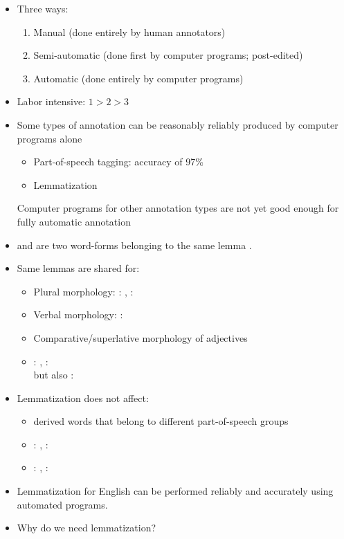 \documentclass[a4paper,landscape,headrule,footrule,dvips]{foils}
\begin{document}
\begin{CJK}{UTF8}{min}
\begin{itemize}
\item  Three ways:
  \begin{enumerate}
  \item Manual (done entirely by human annotators)
  \item Semi-automatic (done first by computer programs; post-edited)
  \item Automatic (done entirely by computer programs)
  \end{enumerate}
\item  Labor intensive: $1 > 2 > 3$
\item  Some types of annotation can be reasonably reliably produced by computer
   programs alone
\begin{itemize}
\item Part-of-speech tagging: accuracy of 97\%
\item Lemmatization
\end{itemize}
Computer programs for other annotation types are not yet good
enough for fully automatic annotation
\end{itemize}





\begin{itemize}
\item  {} and  are two word-forms belonging to the same lemma .
\item  Same lemmas are shared for:
\begin{itemize}
\item  Plural morphology: : , : 
\item  Verbal morphology: : 
\item  Comparative/superlative morphology of adjectives
\item  {}: , :
\\ but also : 
\end{itemize}
\item  Lemmatization does not affect:
  \begin{itemize}
  \item  derived words that belong to different part-of-speech groups
  \item  {}: , : 
  \item  {}: , : 
  \end{itemize}
\item  Lemmatization for English can be performed reliably and accurately
using automated programs.
\item  Why do we need lemmatization?
\end{itemize}


\end{CJK}
\end{document}
